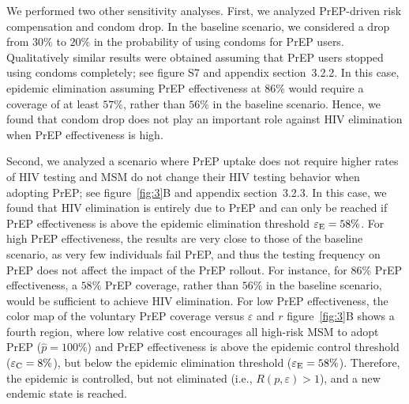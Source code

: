 \documentclass[preprint,review,12pt]{article}			%
\begin{document}
We performed two other sensitivity analyses. First, we analyzed PrEP-driven risk compensation and condom drop. In the baseline scenario, we considered a drop from $30\%$ to $20\%$ in the probability of using condoms for PrEP users. Qualitatively similar results were obtained assuming that PrEP users stopped using condoms completely;\cite{Holt2018} see figure S7 and appendix section~3.2.2. In this case, epidemic elimination assuming PrEP effectiveness at $86\%$ would require a coverage of at least $57\%$, rather than $56\%$ in the baseline scenario. Hence, we found that condom drop does not play an important role against HIV elimination when PrEP effectiveness is high.

Second, we analyzed a scenario where PrEP uptake does not require higher rates of HIV testing and MSM do not change their HIV testing behavior when adopting PrEP; see figure~\ref{fig:3}B and appendix section~3.2.3. In this case, we found that HIV elimination is entirely due to PrEP and can only be reached if PrEP effectiveness is above the epidemic elimination threshold $\varepsilon_{\rm E} = 58\%$. For high PrEP effectiveness, the results are very close to those of the baseline scenario, as very few individuals fail PrEP, and thus the testing frequency on PrEP does not affect the impact of the PrEP rollout. For instance, for $86\%$ PrEP effectiveness, a $58\%$ PrEP coverage, rather than $56\%$ in the baseline scenario, would be sufficient to achieve HIV elimination. For low PrEP effectiveness, the color map of the voluntary PrEP coverage versus $\varepsilon$ and $r$ figure~\ref{fig:3}B shows a fourth region, where low relative cost encourages all high-risk MSM to adopt PrEP ($\hat{p}=100\%$) and PrEP effectiveness is above the epidemic control threshold ($\varepsilon_{\rm C}= 8\%$), but below the epidemic elimination threshold ($\varepsilon_{\rm E}= 58\%$). Therefore, the epidemic is controlled, but not eliminated (i.e., $R(p,\varepsilon)>1$), and a new endemic state is reached.
\end{document}
